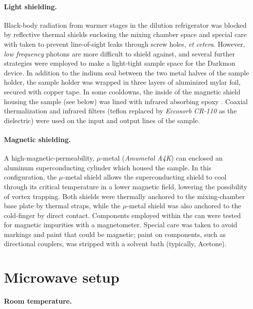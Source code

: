 \paragraph{Light shielding.}

Black-body radiation from warmer stages in the dilution refrigerator
was blocked by reflective thermal shields enclosing the mixing chamber
space and special care with taken to prevent line-of-sight leaks through
screw holes, \emph{et cetera}. However, \emph{low frequency} photons
are more difficult to shield against, and several further strategies
were employed to  make a light-tight sample space for the Darkmon
device. In addition to the indium seal between the two metal halves
of the sample holder, the sample holder was wrapped in three layers
of aluminized mylar foil, secured with copper tape. In some cooldowns,
the inside of the magnetic shield housing the sample (see below) was
lined with infrared absorbing epoxy \citep{Barends2011-qp,Rigetti2012}.
Coaxial thermalization and infrared filters (teflon replaced by\emph{
Eccosorb CR-110} as the dielectric) were used on the input and output
lines of the sample. 

\paragraph{Magnetic shielding. }

A high-magnetic-permeability, $\mu$-metal (\emph{Amumetal A4K}) can
enclosed an aluminum superconducting cylinder which housed the sample.
In this configuration, the $\mu$-metal shield allows the superconducting
shield to cool through its critical temperature in a lower magnetic
field, lowering the possibility of vortex trapping. Both shields were
thermally anchored to the mixing-chamber base plate by thermal straps,
while the $\mu$-metal shield was also anchored to the cold-finger
by direct contact. Components employed within the can were tested
for magnetic impurities with a magnetometer. Special care was taken
to avoid markings and paint that could be magnetic; paint on components,
such as directional couplers, was stripped with a solvent bath (typically,
Acetone). 


\section{Microwave setup\label{sec:Microwave-setup} }

\paragraph{Room temperature.}

